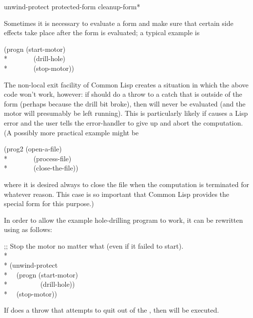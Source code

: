 \begin{defspec}
unwind-protect protected-form {cleanup-form}*

Sometimes it is necessary to evaluate a form and make sure that
certain side effects take place after the form is evaluated;
a typical example is
\begin{lisp}
(progn (start-motor) \\*
~~~~~~~(drill-hole) \\*
~~~~~~~(stop-motor))
\end{lisp}
The non-local exit facility of Common Lisp creates a situation in which
the above code won't work, however: if  should
do a throw to a catch that is outside of the 
form (perhaps because the drill bit broke),
then  will never be evaluated
(and the motor will presumably be left running).
This is particularly likely if  causes a Lisp error
and the user tells the error-handler to give up and abort
the computation.
(A possibly more practical example might be
\begin{lisp}
(prog2 (open-a-file) \\*
~~~~~~~(process-file) \\*
~~~~~~~(close-the-file))
\end{lisp}
where it is desired always to close the file when the computation
is terminated for whatever reason.  This case is so important
that Common Lisp provides the special form  for
this purpose.)

In order to allow the example hole-drilling program to work, it can
be rewritten using  as follows:
\begin{lisp}
;; Stop the motor no matter what (even if it failed to start). \\*
\\*
(unwind-protect \\*
~~(progn (start-motor) \\*
~~~~~~~~~(drill-hole)) \\*
~~(stop-motor))
\end{lisp}
If  does a throw that attempts to quit out of the
, then  will be executed.


\end{defspec}
